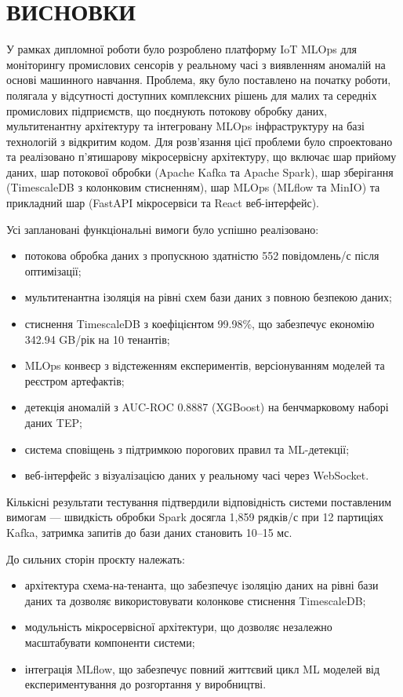 \chapter{ВИСНОВКИ}

У рамках дипломної роботи було розроблено платформу IoT MLOps для моніторингу промислових сенсорів у реальному часі з виявленням аномалій на основі машинного навчання. Проблема, яку було поставлено на початку роботи, полягала у відсутності доступних комплексних рішень для малих та середніх промислових підприємств, що поєднують потокову обробку даних, мультитенантну архітектуру та інтегровану MLOps інфраструктуру на базі технологій з відкритим кодом. Для розв'язання цієї проблеми було спроектовано та реалізовано п'ятишарову мікросервісну архітектуру, що включає шар прийому даних, шар потокової обробки (Apache Kafka та Apache Spark), шар зберігання (TimescaleDB з колонковим стисненням), шар MLOps (MLflow та MinIO) та прикладний шар (FastAPI мікросервіси та React веб-інтерфейс).

Усі заплановані функціональні вимоги було успішно реалізовано:

\begin{itemize}
    \item потокова обробка даних з пропускною здатністю 552 повідомлень/с після оптимізації;
    \item мультитенантна ізоляція на рівні схем бази даних з повною безпекою даних;
    \item стиснення TimescaleDB з коефіцієнтом 99.98\%, що забезпечує економію 342.94 GB/рік на 10 тенантів;
    \item MLOps конвеєр з відстеженням експериментів, версіонуванням моделей та реєстром артефактів;
    \item детекція аномалій з AUC-ROC 0.8887 (XGBoost) на бенчмарковому наборі даних TEP;
    \item система сповіщень з підтримкою порогових правил та ML-детекції;
    \item веб-інтерфейс з візуалізацією даних у реальному часі через WebSocket.
\end{itemize}

Кількісні результати тестування підтвердили відповідність системи поставленим вимогам --- швидкість обробки Spark досягла 1,859 рядків/с при 12 партиціях Kafka, затримка запитів до бази даних становить 10--15 мс.

До сильних сторін проєкту належать:

\begin{itemize}
    \item архітектура схема-на-тенанта, що забезпечує ізоляцію даних на рівні бази даних та дозволяє використовувати колонкове стиснення TimescaleDB;
    \item модульність мікросервісної архітектури, що дозволяє незалежно масштабувати компоненти системи;
    \item інтеграція MLflow, що забезпечує повний життєвий цикл ML моделей від експериментування до розгортання у виробництві.
\end{itemize}

